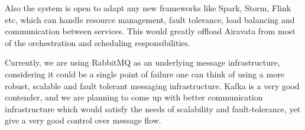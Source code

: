 \documentclass[review]{elsarticle}
\begin{document}
Also the system is open to adapt any new frameworks like Spark, Storm, Flink etc, which can handle resource management, fault tolerance, load balancing and communication between services. This would greatly offload Airavata from most of the orchestration and scheduling responsibilities.

Currently, we are using RabbitMQ as an underlying message infrastructure, considering it could be a single point of failure one can think of using a more robust, scalable and fault tolerant messaging infrastructure. Kafka is a very good contender, and we are planning to come up with better communication infrastructure which would satisfy the needs of scalability and fault-tolerance, yet give a very good control over message flow.


\end{document}
